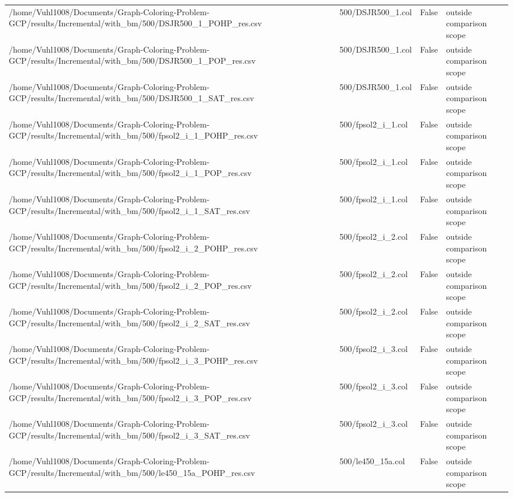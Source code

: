 \begin{table}[htbp]
\begin{tabular}{llll}
/home/Vuhl1008/Documents/Graph-Coloring-Problem-GCP/results/Incremental/with\_bm/500/DSJR500\_1\_POHP\_res.csv & 500/DSJR500\_1.col & False & outside comparison scope \\
/home/Vuhl1008/Documents/Graph-Coloring-Problem-GCP/results/Incremental/with\_bm/500/DSJR500\_1\_POP\_res.csv & 500/DSJR500\_1.col & False & outside comparison scope \\
/home/Vuhl1008/Documents/Graph-Coloring-Problem-GCP/results/Incremental/with\_bm/500/DSJR500\_1\_SAT\_res.csv & 500/DSJR500\_1.col & False & outside comparison scope \\
/home/Vuhl1008/Documents/Graph-Coloring-Problem-GCP/results/Incremental/with\_bm/500/fpsol2\_i\_1\_POHP\_res.csv & 500/fpsol2\_i\_1.col & False & outside comparison scope \\
/home/Vuhl1008/Documents/Graph-Coloring-Problem-GCP/results/Incremental/with\_bm/500/fpsol2\_i\_1\_POP\_res.csv & 500/fpsol2\_i\_1.col & False & outside comparison scope \\
/home/Vuhl1008/Documents/Graph-Coloring-Problem-GCP/results/Incremental/with\_bm/500/fpsol2\_i\_1\_SAT\_res.csv & 500/fpsol2\_i\_1.col & False & outside comparison scope \\
/home/Vuhl1008/Documents/Graph-Coloring-Problem-GCP/results/Incremental/with\_bm/500/fpsol2\_i\_2\_POHP\_res.csv & 500/fpsol2\_i\_2.col & False & outside comparison scope \\
/home/Vuhl1008/Documents/Graph-Coloring-Problem-GCP/results/Incremental/with\_bm/500/fpsol2\_i\_2\_POP\_res.csv & 500/fpsol2\_i\_2.col & False & outside comparison scope \\
/home/Vuhl1008/Documents/Graph-Coloring-Problem-GCP/results/Incremental/with\_bm/500/fpsol2\_i\_2\_SAT\_res.csv & 500/fpsol2\_i\_2.col & False & outside comparison scope \\
/home/Vuhl1008/Documents/Graph-Coloring-Problem-GCP/results/Incremental/with\_bm/500/fpsol2\_i\_3\_POHP\_res.csv & 500/fpsol2\_i\_3.col & False & outside comparison scope \\
/home/Vuhl1008/Documents/Graph-Coloring-Problem-GCP/results/Incremental/with\_bm/500/fpsol2\_i\_3\_POP\_res.csv & 500/fpsol2\_i\_3.col & False & outside comparison scope \\
/home/Vuhl1008/Documents/Graph-Coloring-Problem-GCP/results/Incremental/with\_bm/500/fpsol2\_i\_3\_SAT\_res.csv & 500/fpsol2\_i\_3.col & False & outside comparison scope \\
/home/Vuhl1008/Documents/Graph-Coloring-Problem-GCP/results/Incremental/with\_bm/500/le450\_15a\_POHP\_res.csv & 500/le450\_15a.col & False & outside comparison scope \\

\end{tabular}
\end{table}
